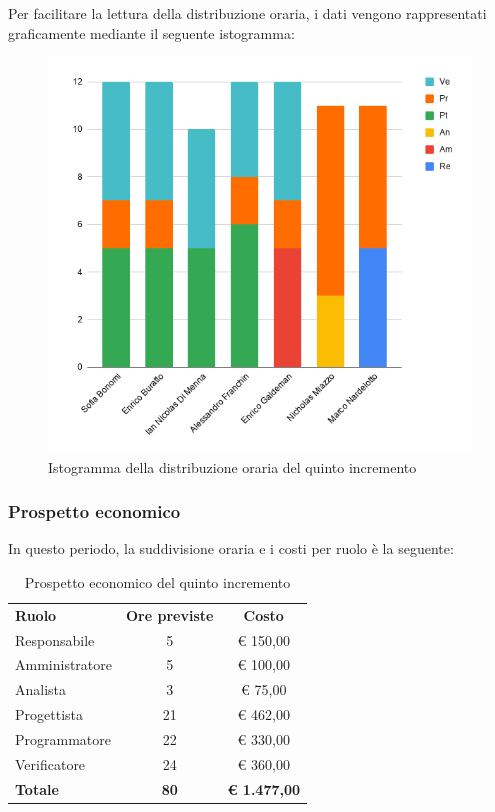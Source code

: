 \documentclass[../piano-di-progetto.tex]{subfiles}
\begin{document}
  Per facilitare la lettura della distribuzione oraria, i dati vengono rappresentati graficamente mediante il seguente istogramma:
  \begin{figure}[H]
    \centering
    \includegraphics[width=12cm]{img/ore-5-incr.png}
    \caption{Istogramma della distribuzione oraria del quinto incremento}
    \label{fig:ore-componente-progettazione}
  \end{figure}

  \subsubsection{Prospetto economico}
  In questo periodo, la suddivisione oraria e i costi per ruolo è la seguente:

  \begin{table}[H]
    \centering
    \begin{tabular}{lcc}
      \rowcolor{lightgray}
      \textbf{Ruolo}  & \textbf{Ore previste} & \textbf{Costo}      \\
Responsabile    & 5                     & € 150,00            \\
Amministratore  & 5                     & € 100,00            \\
Analista        & 3                     & € 75,00             \\
Progettista     & 21                    & € 462,00            \\
Programmatore   & 22                    & € 330,00            \\
Verificatore    & 24                    & € 360,00            \\
\textbf{Totale} & \textbf{80}           & \textbf{€ 1.477,00}
    \end{tabular}
    \caption{Prospetto economico del quinto incremento}
  \end{table}
\end{document}
